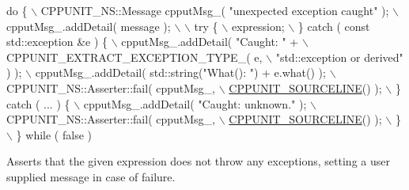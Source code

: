 \begin{DoxyCode}
\textcolor{keywordflow}{do} \{                                                                       \(\backslash\)
      CPPUNIT\_NS::Message cpputMsg\_( \textcolor{stringliteral}{"unexpected exception caught"} );         \(\backslash\)
      cpputMsg\_.addDetail( message );                                         \(\backslash\)
                                                                              \(\backslash\)
      try \{                                                                   \(\backslash\)
         expression;                                                          \(\backslash\)
      \} \textcolor{keywordflow}{catch} ( \textcolor{keyword}{const} std::exception &e ) \{                                   \(\backslash\)
         cpputMsg\_.addDetail( \textcolor{stringliteral}{"Caught: "} +                                    \(\backslash\)
                              CPPUNIT\_EXTRACT\_EXCEPTION\_TYPE\_( e,             \(\backslash\)
                                          \textcolor{stringliteral}{"std::exception or derived"} ) );    \(\backslash\)
         cpputMsg\_.addDetail( std::string(\textcolor{stringliteral}{"What(): "}) + e.what() );           \(\backslash\)
         CPPUNIT\_NS::Asserter::fail( cpputMsg\_,                               \(\backslash\)
                                     \hyperlink{group___creating_new_assertions_ga76898763afdc78bf5924dd7744b4c630}{CPPUNIT\_SOURCELINE}() );                  \(\backslash\)
      \} \textcolor{keywordflow}{catch} ( ... ) \{                                                       \(\backslash\)
         cpputMsg\_.addDetail( \textcolor{stringliteral}{"Caught: unknown."} );                           \(\backslash\)
         CPPUNIT\_NS::Asserter::fail( cpputMsg\_,                               \(\backslash\)
                                     \hyperlink{group___creating_new_assertions_ga76898763afdc78bf5924dd7744b4c630}{CPPUNIT\_SOURCELINE}() );                  \(\backslash\)
      \}                                                                       \(\backslash\)
   \} \textcolor{keywordflow}{while} ( \textcolor{keyword}{false} )
\end{DoxyCode}
Asserts that the given expression does not throw any exceptions, setting a user supplied message in case of failure.


